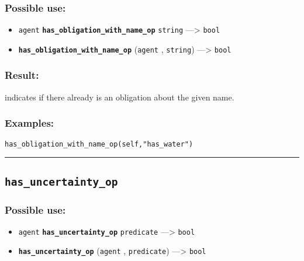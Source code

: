 \documentclass[]{book}
\providecommand{\tightlist}{%
  \setlength{\itemsep}{0pt}\setlength{\parskip}{0pt}}
\theoremstyle{definition}
\theoremstyle{definition}
\theoremstyle{definition}
\theoremstyle{remark}
\begin{document}
\subsubsection{Possible use:}\label{possible-use-255}

\begin{itemize}
\tightlist
\item
  \texttt{agent} \textbf{\texttt{has\_obligation\_with\_name\_op}}
  \texttt{string} ---\textgreater{} \texttt{bool}
\item
  \textbf{\texttt{has\_obligation\_with\_name\_op}} (\texttt{agent} ,
  \texttt{string}) ---\textgreater{} \texttt{bool}
\end{itemize}

\subsubsection{Result:}\label{result-246}

indicates if there already is an obligation about the given name.

\subsubsection{Examples:}\label{examples-195}

\begin{verbatim}
has_obligation_with_name_op(self,"has_water") 
\end{verbatim}

\begin{center}\rule{0.5\linewidth}{\linethickness}\end{center}

\subsection{\texorpdfstring{\texttt{has\_uncertainty\_op}}{has\_uncertainty\_op}}\label{has_uncertainty_op}

\subsubsection{Possible use:}\label{possible-use-256}

\begin{itemize}
\tightlist
\item
  \texttt{agent} \textbf{\texttt{has\_uncertainty\_op}}
  \texttt{predicate} ---\textgreater{} \texttt{bool}
\item
  \textbf{\texttt{has\_uncertainty\_op}} (\texttt{agent} ,
  \texttt{predicate}) ---\textgreater{} \texttt{bool}
\end{itemize}
\end{document}
